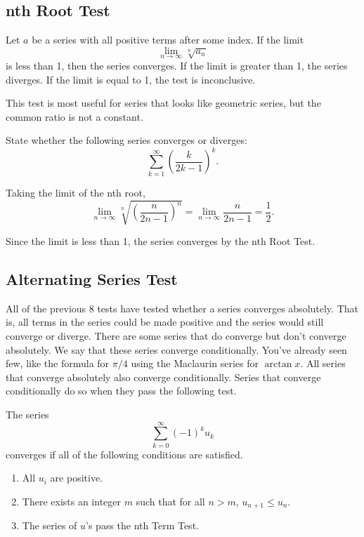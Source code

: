 \subsection{nth Root Test}
\begin{lemma}
	Let $a$ be a series with all positive terms after some index.
	If the limit
	\begin{equation*}
		\lim_{n\to\infty}{\sqrt[n]{a_n}}
	\end{equation*}
	is less than 1, then the series converges.
	If the limit is greater than 1, the series diverges.
	If the limit is equal to 1, the test is inconclusive.
\end{lemma}

This test is most useful for series that looks like geometric series, but the common ratio is not a constant.

\begin{example}
	State whether the following series converges or diverges:
	\begin{equation*}
		\sum_{k=1}^{\infty}{\left(\frac{k}{2k-1}\right)^k}.
	\end{equation*}
\end{example}
\begin{answer}
	Taking the limit of the nth root,
	\begin{equation*}
		\lim_{n\to\infty}{\sqrt[n]{\left(\frac{n}{2n-1}\right)^n}} = \lim_{n\to\infty}{\frac{n}{2n-1}} = \frac{1}{2}.
	\end{equation*}
	
	Since the limit is less than 1, the series converges by the nth Root Test.
\end{answer}

\subsection{Alternating Series Test}
All of the previous 8 tests have tested whether a series converges absolutely.
That is, all terms in the series could be made positive and the series would still converge or diverge.
There are some series that do converge but don't converge absolutely.
We say that these series converge conditionally.
You've already seen  few, like the formula for $\pi/4$ using the Maclaurin series for $\arctan{x}$.
All series that converge absolutely also converge conditionally.
Series that converge conditionally do so when they pass the following test.

\begin{lemma}
	The series
	\begin{equation*}
		\sum_{k=0}^{\infty}{(-1)^ku_k}
	\end{equation*}
	converges if all of the following conditions are satisfied.
	\begin{enumerate}
		\item All $u_i$ are positive.
		\item There exists an integer $m$ such that for all $n > m$, $u_{n+1} \leq u_n$.
		\item The series of $u$'s pass the nth Term Test.
	\end{enumerate}
\end{lemma}

